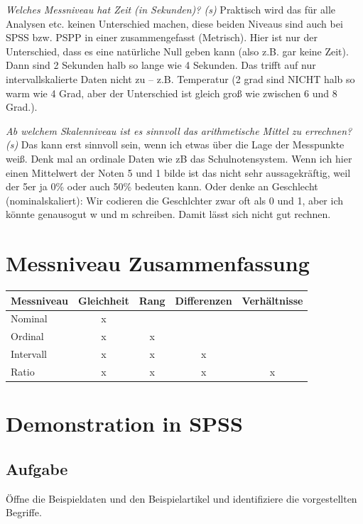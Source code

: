 \documentclass[
]{book}
\begin{document}
\emph{Welches Messniveau hat Zeit (in Sekunden)? (s)}
Praktisch wird das für alle Analysen etc. keinen Unterschied machen, diese beiden Niveaus sind auch bei SPSS bzw. PSPP in einer zusammengefasst (Metrisch). Hier ist nur der Unterschied, dass es eine natürliche Null geben kann (also z.B. gar keine Zeit). Dann sind 2 Sekunden halb so lange wie 4 Sekunden. Das trifft auf nur intervallskalierte Daten nicht zu -- z.B. Temperatur (2 grad sind NICHT halb so warm wie 4 Grad, aber der Unterschied ist gleich groß wie zwischen 6 und 8 Grad.).

\emph{Ab welchem Skalenniveau ist es sinnvoll das arithmetische Mittel zu errechnen? (s)}
Das kann erst sinnvoll sein, wenn ich etwas über die Lage der Messpunkte weiß. Denk mal an ordinale Daten wie zB das Schulnotensystem. Wenn ich hier einen Mittelwert der Noten 5 und 1 bilde ist das nicht sehr aussagekräftig, weil der 5er ja 0\% oder auch 50\% bedeuten kann. Oder denke an Geschlecht (nominalskaliert): Wir codieren die Geschlchter zwar oft als 0 und 1, aber ich könnte genausogut w und m schreiben. Damit lässt sich nicht gut rechnen.

\hypertarget{messniveau-zusammenfassung}{%
\section{Messniveau Zusammenfassung}\label{messniveau-zusammenfassung}}

\begin{longtable}[]{@{}lcccc@{}}
\toprule
Messniveau & Gleichheit & Rang & Differenzen & Verhältnisse\tabularnewline
\midrule
\endhead
Nominal & x & & &\tabularnewline
Ordinal & x & x & &\tabularnewline
Intervall & x & x & x &\tabularnewline
Ratio & x & x & x & x\tabularnewline
\bottomrule
\end{longtable}

\hypertarget{demonstration-in-spss}{%
\section{Demonstration in SPSS}\label{demonstration-in-spss}}

\hypertarget{aufgabe}{%
\subsection{Aufgabe}\label{aufgabe}}

Öffne die Beispieldaten und den Beispielartikel und identifiziere die vorgestellten Begriffe.
\end{document}
